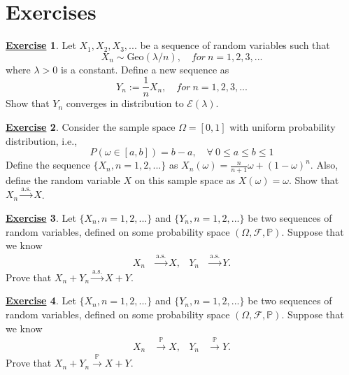 \documentclass[12pt]{book}
\numberwithin{equation}{chapter}
\theoremstyle{plain}
\numberwithin{theorem}{section}
\theoremstyle{definition}
\newtheorem{exercise}{\underline{Exercise}}
\numberwithin{exercise}{chapter}
\newcommand{\<}{\langle}
\renewcommand{\>}{\rangle}
\renewcommand{\(}{\left(}
\renewcommand{\)}{\right)}
\renewcommand{\[}{\left[}
\renewcommand{\]}{\right]}
\newcommand\Pb{\mathds{P}}
\newcommand\Ec{\mathscr{E}}
\newcommand\Fc{\mathscr{F}}
\newcommand\om{\omega}
\newcommand\Om{\Omega}
\begin{document}
\section{Exercises}
\label{sec:exercises-6}

\begin{exercise}
\label{exer:6.1}
Let $X_1, X_2, X_3, ...$ be a sequence of random variables such that 
$$ X_n \sim \text{Geo}(\lambda/n),  \quad for  \ n = 1,2,3,...$$ 
where $\lambda > 0$ is a constant. Define a new sequence as 
$$ Y_n  := \frac{1}{n} X_n, \quad for \ n=1,2,3,...$$
Show that $Y_n$ converges in distribution to $\Ec(\lambda)$.
\end{exercise}

\begin{exercise}
\label{exer:6.2}
Consider the sample space $\Om = [0,1]$ with uniform probability distribution, i.e., 
$$ P( \om \in [a,b]) = b - a, \quad \forall \ 0 \leq a \leq b \leq 1 $$
Define the sequence $\{X_n, n=1,2,...\}$ as $X_n(\om) = \frac{n}{n+1}\om + (1-\om)^n$. Also, define the random variable $X$ on this sample space as $X(\om) = \om$. Show that $X_n \stackrel{\text{a.s.}}{\rightarrow} X$.
\end{exercise}

\begin{exercise}
\label{exer:6.3}
Let $\{ X_n, n=1,2,...\}$ and $\{  Y_n, n=1,2,...  \}$ be two sequences of random variables, defined on some probability space $(\Om,\Fc,\Pb)$. Suppose that we know 
\begin{align}
X_n &\stackrel{\text{a.s.}}{\rightarrow} X , &
Y_n &\stackrel{\text{a.s.}}{\rightarrow} Y .
\end{align}
Prove that $X_n + Y_n \stackrel{\text{a.s.}}{\rightarrow} X+Y$.
\end{exercise}

\begin{exercise}
\label{exer:6.4}
Let $\{ X_n, n=1,2,...\}$ and $\{  Y_n, n=1,2,...  \}$ be two sequences of random variables, defined on some probability space $(\Om,\Fc,\Pb)$. Suppose that we know 
\begin{align}
X_n &\stackrel{\Pb}{\rightarrow} X , &
Y_n &\stackrel{\Pb}{\rightarrow} Y .
\end{align}
Prove that $X_n + Y_n \stackrel{\Pb}{\rightarrow} X+Y$.
\end{exercise}
\end{document}
